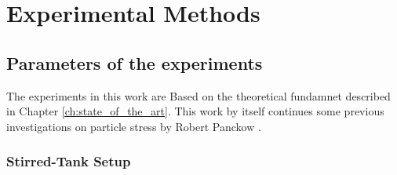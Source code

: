 \chapter{Experimental Methods} \label{ch:experimentalMethods}

\section{Parameters of the experiments}
The experiments in this work are Based on the theoretical fundamnet described in Chapter \ref{ch:state_of_the_art}. This work by itself continues some previous investigations on particle stress by Robert Panckow .

\subsection{Stirred-Tank Setup}
